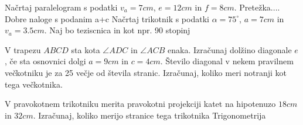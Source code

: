 \documentclass[arhiv]{izpit}
\begin{document}
\naloga[\tocke{8}]
  \podnaloga[4]
  Načrtaj paralelogram s podatki $v_a=7cm$, $e=12cm$ in $f=8cm$. Pretežka.... Dobre naloge s podanim a+c
  \prostor[1]
  \podnaloga[4]
  Načrtaj trikotnik s podatki $\alpha =75^\circ$, $a=7cm$ in $v_a=3.5cm$. Naj bo teziscnica in kot npr. 90 stopinj
  \prostor[1]


  
\naloga[\tocke{8}]
  \podnaloga[4]
  V trapezu $ABCD$ sta kota $\angle ADC$ in $\angle ACB$ enaka. Izračunaj dolžino diagonale $e$, če sta osnovnici dolgi $a=9cm$ in $c=4cm$.
  \prostor[2]
  \podnaloga[4]
  Število diagonal v nekem pravilnem večkotniku je za 25 večje od števila stranic. Izračunaj, koliko meri notranji kot tega večkotnika.
  \prostor[1]


\naloga[\tocke{8}]
  \podnaloga[4]
  V pravokotnem trikotniku merita pravokotni projekciji katet na hipotenuzo $18cm$ in $32cm$. Izračunaj, koliko merijo stranice tega trikotnika
  \prostor[1]
  \podnaloga[4]
  Trigonometrija
  \prostor[1]
\end{document}

